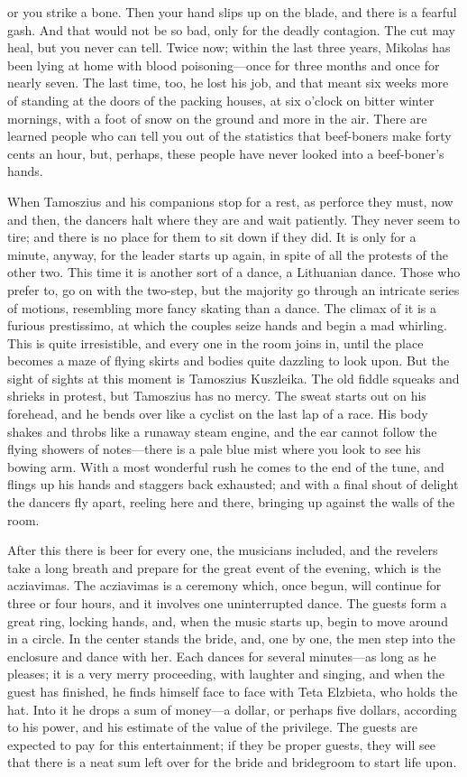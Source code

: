 \documentclass[
]{book}
\theoremstyle{definition}
\theoremstyle{definition}
\theoremstyle{definition}
\theoremstyle{definition}
\theoremstyle{remark}
\begin{document}
or you strike a bone. Then your hand slips up on the blade, and there is a fearful gash. And that would not be so bad, only for the deadly contagion. The cut may heal, but you never can tell. Twice now; within the last three years, Mikolas has been lying at home with blood poisoning---once for three months and once for nearly seven. The last time, too, he lost his job, and that meant six weeks more of standing at the doors of the packing houses, at six o'clock on bitter winter mornings, with a foot of snow on the ground and more in the air. There are learned people who can tell you out of the statistics that beef-boners make forty cents an hour, but, perhaps, these people have never looked into a beef-boner's hands.

When Tamoszius and his companions stop for a rest, as perforce they must, now and then, the dancers halt where they are and wait patiently. They never seem to tire; and there is no place for them to sit down if they did. It is only for a minute, anyway, for the leader starts up again, in spite of all the protests of the other two. This time it is another sort of a dance, a Lithuanian dance. Those who prefer to, go on with the two-step, but the majority go through an intricate series of motions, resembling more fancy skating than a dance. The climax of it is a furious prestissimo, at which the couples seize hands and begin a mad whirling. This is quite irresistible, and every one in the room joins in, until the place becomes a maze of flying skirts and bodies quite dazzling to look upon. But the sight of sights at this moment is Tamoszius Kuszleika. The old fiddle squeaks and shrieks in protest, but Tamoszius has no mercy. The sweat starts out on his forehead, and he bends over like a cyclist on the last lap of a race. His body shakes and throbs like a runaway steam engine, and the ear cannot follow the flying showers of notes---there is a pale blue mist where you look to see his bowing arm. With a most wonderful rush he comes to the end of the tune, and flings up his hands and staggers back exhausted; and with a final shout of delight the dancers fly apart, reeling here and there, bringing up against the walls of the room.

After this there is beer for every one, the musicians included, and the revelers take a long breath and prepare for the great event of the evening, which is the acziavimas. The acziavimas is a ceremony which, once begun, will continue for three or four hours, and it involves one uninterrupted dance. The guests form a great ring, locking hands, and, when the music starts up, begin to move around in a circle. In the center stands the bride, and, one by one, the men step into the enclosure and dance with her. Each dances for several minutes---as long as he pleases; it is a very merry proceeding, with laughter and singing, and when the guest has finished, he finds himself face to face with Teta Elzbieta, who holds the hat. Into it he drops a sum of money---a dollar, or perhaps five dollars, according to his power, and his estimate of the value of the privilege. The guests are expected to pay for this entertainment; if they be proper guests, they will see that there is a neat sum left over for the bride and bridegroom to start life upon.
\end{document}
